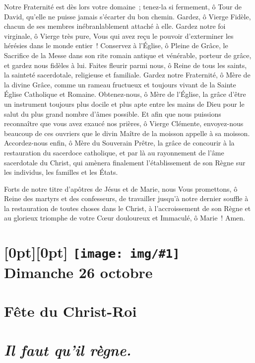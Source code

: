 \documentclass[%
a5paper%
,11pt%
,DIV=15%
,titlepage=on%
,headings=optiontoheadandtoc%
,headings=small%
,parskip=false%
,openany%
]{scrbook}
\newcommand{\bgimage}[1]{%
\raisebox{-.45\paperheight}[0pt][0pt]{%
  \transparent{0.3}%
  \texttt{[image: img/\#1]}%
  }%
}
\begin{document}
\begin{multicols}{2}
Notre Fraternité est dès lors votre domaine ; tenez-la si fermement, ô Tour de David, qu’elle ne puisse jamais s’écarter du bon chemin. Gardez, ô Vierge Fidèle, chacun de ses membres inébranlablement attaché à elle. Gardez notre foi virginale, ô Vierge très pure, Vous qui avez reçu le pouvoir d’exterminer les hérésies dans le monde entier ! Conservez à l’Église, ô Pleine de Grâce, le Sacrifice de la Messe dans son rite romain antique et vénérable, porteur de grâce, et gardez nous fidèles à lui. Faites fleurir parmi nous, ô Reine de tous les saints, la sainteté sacerdotale, religieuse et familiale. Gardez notre Fraternité, ô Mère de la divine Grâce, comme un rameau fructueux et toujours vivant de la Sainte Église Catholique et Romaine. Obtenez-nous, ô Mère de l’Église, la grâce d’être un instrument toujours plus docile et plus apte entre les mains de Dieu pour le salut du plus grand nombre d’âmes possible. Et afin que nous puissions reconnaître que vous avez exaucé nos prières, ô Vierge Clémente, envoyez-nous beaucoup de ces ouvriers que le divin Maître de la moisson appelle à sa moisson. Accordez-nous enfin, ô Mère du Souverain Prêtre, la grâce de concourir à la restauration du sacerdoce catholique, et par là au rayonnement de l’âme sacerdotale du Christ, qui amènera finalement l’établissement de son Règne sur les individus, les familles et les États.

Forts de notre titre d’apôtres de Jésus et de Marie, nous Vous promettons, ô Reine des martyrs et des confesseurs, de travailler jusqu’à notre dernier souffle à la restauration de toutes choses dans le Christ, à l’accroissement de son Règne et au glorieux triomphe de votre Cœur douloureux et Immaculé, ô Marie ! Amen.
\end{multicols}




\part[Dimanche 26 octobre]{%
\bgimage{ChristRoi}\\
Dimanche 26 octobre\\\ \\ {\large Fête du Christ-Roi\\\ \\ \emph{Il faut qu'il règne.}}}
\end{document}
